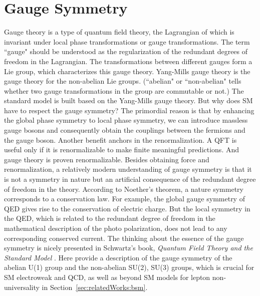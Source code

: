 








\section{Gauge Symmetry}
\label{sec:relatedWorks:qft:gaugeSymmetry}

Gauge theory is a type of quantum field theory, the Lagrangian of which is invariant under local phase transformations or gauge transformations. The term ``gauge" should be understood as the regularization of the redundant degrees of freedom in the Lagrangian. The transformations between different gauges form a Lie group, which characterizes this gauge theory. Yang-Mills gauge theory is the gauge theory for the non-abelian Lie groups. (``abelian" or ``non-abelian" tells whether two gauge transformations in the group are commutable or not.) The standard model is built based on the Yang-Mills gauge theory. But why does SM have to respect the gauge symmetry? The primordial reason is that by enhancing the global phase symmetry to local phase symmetry, we can introduce massless gauge bosons and consequently obtain the couplings between the fermions and the gauge boson. Another benefit anchors in the renormalization. A QFT is useful only if it is renormalizable to make finite meaningful predictions. And gauge theory is proven renormalizable. Besides obtaining force and renormalization, a relatively modern understanding of gauge symmetry is that it is not a symmetry in nature but an artificial consequence of the redundant degree of freedom in the theory. According to Noether's theorem, a nature symmetry corresponds to a conservation law. For example, the global gauge symmetry of QED gives rise to the conservation of electric charge. But the local symmetry in the QED, which is related to the redundant degree of freedom in the mathematical description of the photo polarization, does not lead to any corresponding conserved current. The thinking about the essence of the gauge symmetry is nicely presented in Schwartz's book, \textit{Quantum Field Theory and the Standard Model} \cite{schwartz2014quantum}. Here provide a description of the gauge symmetry of the abelian U(1) group and the non-abelian SU(2), SU(3) groups, which is crucial for SM electroweak and QCD, as well as beyond SM models for lepton non-universality in Section~\ref{sec:relatedWorks:bsm}.


